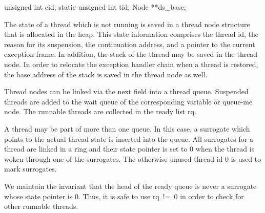 unsigned int        cid;
static unsigned int tid;
Node                **ds_base;

\nwendcode{}\nwdocspar
The state of a thread which is not running is saved in a thread
node structure that is allocated in the heap. This state information
comprises the thread id, the reason for its suspension, the
continuation address, and a pointer to the current exception frame. In
addition, the stack of the thread may be saved in the thread node. In
order to relocate the exception handler chain when a thread is
restored, the base address of the stack is saved in the thread node as
well.

Thread nodes can be linked via the {\Tt{}next\nwendquote} field into a thread queue.
Suspended threads are added to the wait queue of the corresponding
variable or queue-me node. The runnable threads are collected in the
ready list {\Tt{}rq\nwendquote}.

A thread may be part of more than one queue. In this case, a surrogate
which points to the actual thread state is inserted into the queue.
All surrogates for a thread are linked in a ring and their state
pointer is set to {\Tt{}0\nwendquote} when the thread is woken through one of the
surrogates. The otherwise unused thread id {\Tt{}0\nwendquote} is used to mark
surrogates.

We maintain the invariant that the head of the ready queue is never a
surrogate whose state pointer is {\Tt{}0\nwendquote}. Thus, it is safe to use
{\Tt{}rq\ !=\ 0\nwendquote} in order to check for other runnable threads.

